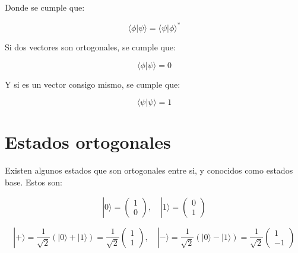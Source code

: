 \documentclass[11pt]{article}
\begin{document}
Donde se cumple que:

\begin{equation}
    \langle \phi | \psi \rangle = \langle \psi | \phi \rangle^*
\end{equation}

Si dos vectores son ortogonales, se cumple que:

\begin{equation}
    \langle \phi | \psi \rangle = 0
\end{equation}

Y si es un vector consigo mismo, se cumple que:

\begin{equation}
    \langle \psi | \psi \rangle = 1
\end{equation}


















\section{Estados ortogonales}

Existen algunos estados que son ortogonales entre si, y conocidos como estados base. Estos son:

\begin{equation}
    |0\rangle = \begin{pmatrix} 1 \\ 0 \end{pmatrix}, \quad |1\rangle = \begin{pmatrix} 0 \\ 1 \end{pmatrix}
\end{equation}

\begin{equation}
    |+\rangle = \frac{1}{\sqrt{2}} (|0\rangle + |1\rangle) = \frac{1}{\sqrt{2}} \begin{pmatrix} 1 \\ 1 \end{pmatrix}, \quad |-\rangle = \frac{1}{\sqrt{2}} (|0\rangle - |1\rangle) = \frac{1}{\sqrt{2}} \begin{pmatrix} 1 \\ -1 \end{pmatrix}
\end{equation}
\end{document}

